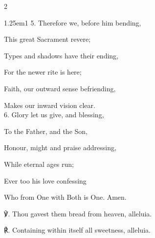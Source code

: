 \begin{multicols}{2}
\begin{hangparas}{1.25em}{1}
5. Therefore we, before him bending,

This great Sacrament revere;

Types and shadows have their ending,

For the newer rite is here;

Faith, our outward sense befriending,

Makes our inward vision clear.\\

6. Glory let us give, and blessing,

To the Father, and the Son,

Honour, might and praise addressing,

While eternal ages run;

Ever too his love confessing

Who from One with Both is One. Amen.\\
\end{hangparas}

℣. Thou gavest them bread from heaven, alleluia.

℟. Containing within itself all sweetness, alleluia.

\end{multicols}

\mattins
{}

